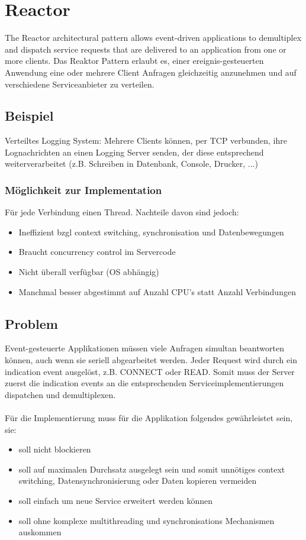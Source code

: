 \section{Reactor}
\label{sec:reactor}

The Reactor architectural pattern allows event-driven applications to demultiplex and dispatch service requests that are delivered to an application from one or more clients.
Das Reaktor Pattern erlaubt es, einer ereignis-gesteuerten Anwendung eine oder mehrere Client Anfragen gleichzeitig anzunehmen und auf verschiedene Serviceanbieter zu verteilen.


\subsection{Beispiel}

Verteiltes Logging System: Mehrere Clients können, per TCP verbunden, ihre Lognachrichten an einen Logging Server senden, der diese entsprechend weiterverarbeitet (z.B. Schreiben in Datenbank, Console, Drucker, ...)

\subsubsection*{Möglichkeit zur Implementation}

Für jede Verbindung einen Thread. Nachteile davon sind jedoch:
\begin{itemize}
	\item Ineffizient bzgl context switching, synchronisation und Datenbewegungen
	\item Braucht concurrency control im Servercode
	\item Nicht überall verfügbar (OS abhängig)
	\item Manchmal besser abgestimmt auf Anzahl CPU’s statt Anzahl Verbindungen
\end{itemize}


\subsection{Problem}
Event-gesteuerte Applikationen müssen viele Anfragen simultan beantworten können, auch wenn sie seriell abgearbeitet werden. Jeder Request wird durch ein indication event ausgelöst, z.B. CONNECT oder READ. Somit muss der Server zuerst die indication events an die entsprechenden Serviceimplementierungen dispatchen und demultiplexen.\\
\\
Für die Implementierung muss für die Applikation folgendes gewährleistet sein, sie:
\begin{itemize}
	\item soll nicht blockieren
	\item soll auf maximalen Durchsatz ausgelegt sein und somit unnötiges context switching, Datensynchronisierung oder Daten kopieren vermeiden
	\item soll einfach um neue Service erweitert werden können
	\item soll ohne komplexe multithreading und synchronisations Mechanismen auskommen
\end{itemize}


